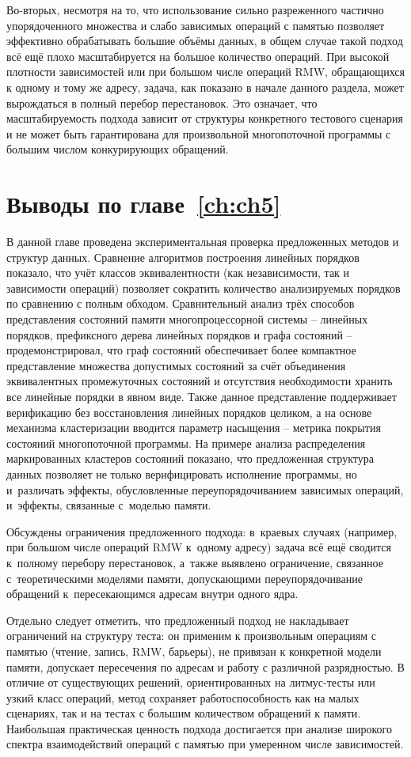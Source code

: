 Во-вторых, несмотря на то, что использование сильно разреженного
частично упорядоченного множества и слабо зависимых операций с
памятью позволяет эффективно обрабатывать большие объёмы данных, в
общем случае такой подход всё ещё плохо масштабируется на большое
количество операций. При высокой плотности зависимостей или при
большом числе операций RMW, обращающихся к одному и тому же адресу,
задача, как показано в начале данного раздела, может вырождаться в
полный перебор перестановок. Это означает, что масштабируемость
подхода зависит от структуры конкретного тестового сценария и не
может быть гарантирована для произвольной многопоточной программы с
большим числом конкурирующих обращений.

\section{Выводы по главе~\ref{ch:ch5}}

В данной главе проведена экспериментальная проверка предложенных
методов и структур данных. Сравнение алгоритмов построения линейных
порядков показало, что учёт классов эквивалентности (как
независимости, так и зависимости операций) позволяет сократить
количество анализируемых порядков по сравнению с полным обходом.
Сравнительный анализ трёх способов представления состояний памяти
многопроцессорной системы -- линейных порядков, префиксного дерева
линейных порядков и графа состояний -- продемонстрировал, что граф
состояний обеспечивает более компактное представление множества
допустимых состояний за счёт объединения эквивалентных промежуточных
состояний и отсутствия необходимости хранить все линейные порядки в явном виде.
Также данное представление поддерживает верификацию без
восстановления линейных порядков целиком, а на основе механизма
кластеризации вводится параметр насыщения -- метрика покрытия
состояний многопоточной программы.
На примере анализа распределения маркированных кластеров состояний
показано, что предложенная структура данных позволяет не только
верифицировать исполнение программы, но и~различать эффекты,
обусловленные переупорядочиванием зависимых операций, и~эффекты,
связанные с~моделью памяти.

Обсуждены ограничения предложенного подхода: в~краевых случаях
(например, при большом числе операций RMW к~одному адресу) задача
всё ещё сводится к~полному перебору перестановок, а~также выявлено
ограничение, связанное с~теоретическими моделями памяти,
допускающими переупорядочивание обращений к~пересекающимся адресам
внутри одного ядра.

Отдельно следует отметить, что предложенный подход не накладывает
ограничений на структуру теста: он применим к произвольным операциям
с памятью (чтение, запись, RMW, барьеры), не привязан к конкретной
модели памяти, допускает пересечения по адресам и работу с различной
разрядностью. В отличие от существующих решений, ориентированных на
литмус-тесты или узкий класс операций, метод сохраняет
работоспособность как на малых сценариях, так и на тестах с большим
количеством обращений к памяти. Наибольшая практическая
ценность подхода достигается при анализе широкого спектра
взаимодействий операций с памятью при умеренном числе зависимостей.

\clearpage
